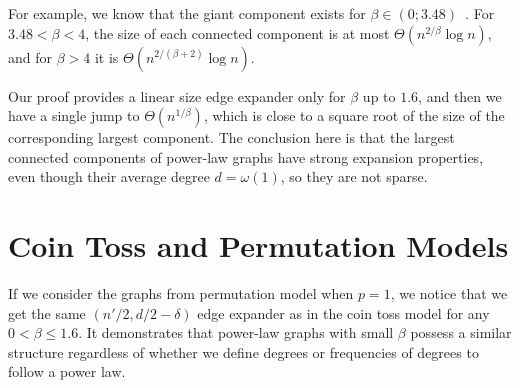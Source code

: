 For example, we know that the giant component exists for $\beta\in(0;3.48)$~\cite{acl01,cl06}.
For $3.48<\beta<4$, the size of each connected component
is at most $\Theta\left(n^{2/\beta}\log n\right)$,
and for $\beta>4$ it is $\Theta\left(n^{2/(\beta+2)}\log n\right)$.

Our proof provides a linear size edge expander only for $\beta$ up to $1.6$,
and then we have a single jump to $\Theta\left(n^{1/\beta}\right)$, which is
close to a square root of the size of the corresponding largest component.
The conclusion here is that the largest connected components
of power-law graphs have strong expansion properties,
even though their average degree $d=\omega(1)$, so they are not sparse.

\section{Coin Toss and Permutation Models}

If we consider the graphs from permutation model when $p=1$,
we notice that we get the same $(n'/2,d/2-\delta)$ edge expander
as in the coin toss model for any $0<\beta\leq 1.6$.
It demonstrates that power-law graphs with small $\beta$ possess
a similar structure regardless of whether we define
degrees or frequencies of degrees to follow a power law.
